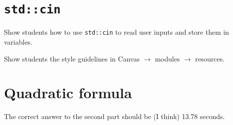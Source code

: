 \documentclass{article}
\begin{document}
\section{\texttt{std::cin}}

Show students how to use \texttt{std::cin} to read user inputs and store them in variables.

Show students the style guidelines in Canvas $\rightarrow$ modules $\rightarrow$ resources.

\section{Quadratic formula}

The correct answer to the second part should be (I think) 13.78 seconds.
\end{document}
